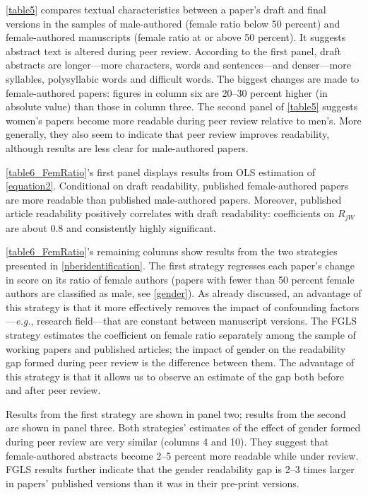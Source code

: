 \autoref{table5} compares textual characteristics between a paper's draft and final versions in the samples of male-authored (female ratio below 50 percent) and female-authored manuscripts (female ratio at or above 50 percent). It suggests abstract text is altered during peer review. According to the first panel, draft abstracts are longer---more characters, words and sentences---and denser---more syllables, polysyllabic words and difficult words. The biggest changes are made to female-authored papers: figures in column six are 20--30 percent higher (in absolute value) than those in column three. The second panel of \autoref{table5} suggests women's papers become more readable during peer review relative to men's. More generally, they also seem to indicate that peer review improves readability, although results are less clear for male-authored papers.

\autoref{table6_FemRatio}'s first panel displays results from OLS estimation of \autoref{equation2}. Conditional on draft readability, published female-authored papers are more readable than published male-authored papers. Moreover, published article readability positively correlates with draft readability: coefficients on $R_{jW}$ are about 0.8 and consistently highly significant.



\autoref{table6_FemRatio}'s remaining columns show results from the two strategies presented in \autoref{nberidentification}. The first strategy regresses each paper's change in score on its ratio of female authors (papers with fewer than 50 percent female authors are classified as male, see \autoref{gender}). As already discussed, an advantage of this strategy is that it more effectively removes the impact of confounding factors---\emph{e.g.}, research field---that are constant between manuscript versions. The FGLS strategy estimates the coefficient on female ratio separately among the sample of working papers and published articles; the impact of gender on the readability gap formed during peer review is the difference between them. The advantage of this strategy is that it allows us to observe an estimate of the gap both before and after peer review.

Results from the first strategy are shown in panel two; results from the second are shown in panel three. Both strategies' estimates of the effect of gender formed during peer review are very similar (columns 4 and 10). They suggest that female-authored abstracts become 2--5 percent more readable while under review. FGLS results further indicate that the gender readability gap is 2--3 times larger in papers' published versions than it was in their pre-print versions.

